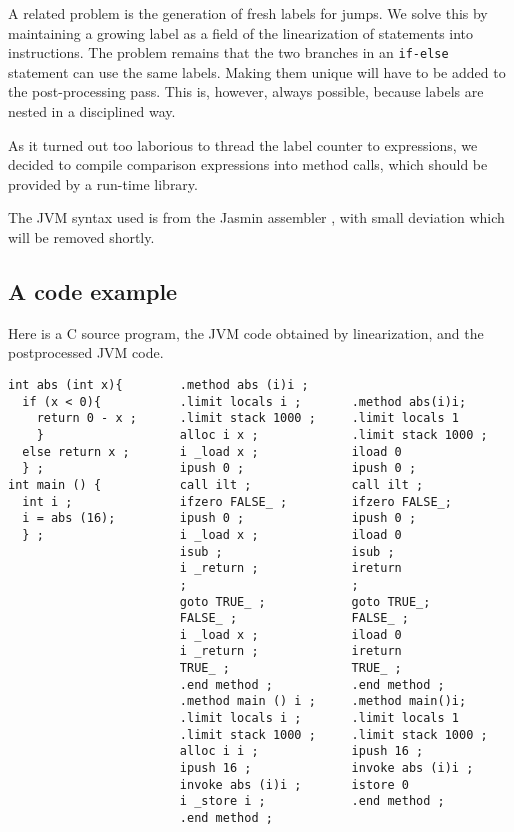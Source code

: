 \documentclass[12pt]{article}
\begin{document}
A related problem is the generation of fresh labels for
jumps. We solve this by maintaining a growing label
as a field of the linearization of statements into
instructions. The problem remains that the two branches
in an \texttt{if-else} statement can use the same
labels. Making them unique will have to be
added to the post-processing pass. This is, however,
always possible, because labels are nested in a
disciplined way.

As it turned out too laborious to thread the label counter
to expressions, we decided to compile comparison
expressions into method calls, which should be provided
by a run-time library.

The JVM syntax used is from the Jasmin assembler
\cite{jasmin}, with small deviation which will
be removed shortly.


\subsection{A code example}

Here is a C source program, the JVM code obtained by linearization, and
the postprocessed JVM code.
\small
\begin{verbatim}
int abs (int x){        .method abs (i)i ;
  if (x < 0){           .limit locals i ;       .method abs(i)i;
    return 0 - x ;      .limit stack 1000 ;     .limit locals 1
    }                   alloc i x ;             .limit stack 1000 ;
  else return x ;       i _load x ;             iload 0
  } ;                   ipush 0 ;               ipush 0 ;
int main () {           call ilt ;              call ilt ;
  int i ;               ifzero FALSE_ ;         ifzero FALSE_;
  i = abs (16);         ipush 0 ;               ipush 0 ;
  } ;                   i _load x ;             iload 0
                        isub ;                  isub ;
                        i _return ;             ireturn
                        ;                       ;
                        goto TRUE_ ;            goto TRUE_;
                        FALSE_ ;                FALSE_ ;
                        i _load x ;             iload 0
                        i _return ;             ireturn
                        TRUE_ ;                 TRUE_ ;
                        .end method ;           .end method ;
                        .method main () i ;     .method main()i;
                        .limit locals i ;       .limit locals 1
                        .limit stack 1000 ;     .limit stack 1000 ;
                        alloc i i ;             ipush 16 ;
                        ipush 16 ;              invoke abs (i)i ;
                        invoke abs (i)i ;       istore 0
                        i _store i ;            .end method ;
                        .end method ;
\end{verbatim}
\normalsize
\end{document}
